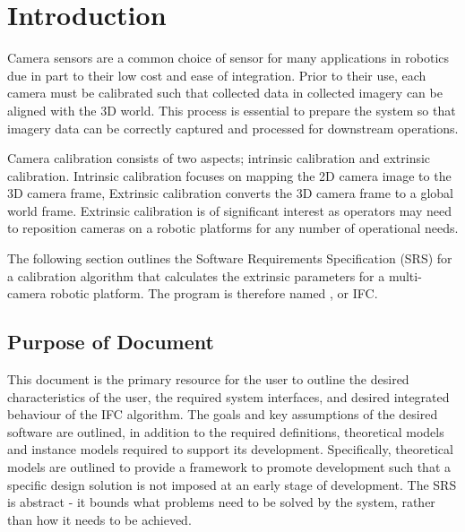 \documentclass[12pt]{article}
\begin{document}
\newpage


\section{Introduction}
Camera sensors are a common choice of sensor for many applications in robotics due 
in part to their low cost and ease of integration. Prior to their use, each camera 
must be calibrated such that collected data in collected imagery can be aligned with 
the 3D world. This process is essential to prepare the system so that 
imagery data can be correctly captured and processed for downstream operations.

Camera calibration consists of two aspects; intrinsic calibration and extrinsic 
calibration. Intrinsic calibration focuses on mapping the 2D camera image 
to the 3D camera frame, Extrinsic calibration converts the 3D camera frame
to a global world frame. Extrinsic calibration is of significant interest as  
operators may need to reposition cameras on a robotic platforms for any number of 
operational needs.

The following section outlines the Software Requirements Specification (SRS) for 
a calibration algorithm that calculates the extrinsic parameters for a multi-camera 
robotic platform. The program is therefore named \progname, 
or IFC.


\subsection{Purpose of Document}

This document is the primary resource for the user to outline the desired 
characteristics of the user, the required system interfaces, and desired 
integrated behaviour of the IFC algorithm. The goals and key assumptions of the
desired software are outlined, in addition to the required definitions, 
theoretical models and instance models required to support its development. 
Specifically, theoretical models are outlined to provide a framework to promote 
development such that a specific design solution is not imposed at an early stage 
of development. The SRS is abstract - it bounds what problems need to be solved by 
the system, rather than how it needs to be achieved.
\end{document}
